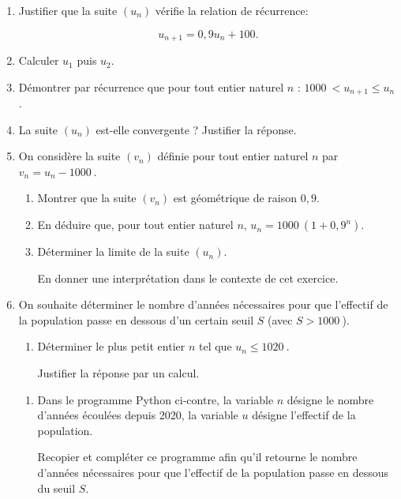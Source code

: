 \documentclass[10pt]{article}
\providecommand{\np}[2][]{{#2~#1}}
\begin{document}
\begin{enumerate}
\item Justifier que la suite $\left(u_n\right)$ vérifie la relation de récurrence:

\[u_{n+1} = 0,9u_n + 100.\]

\item Calculer $u_1$ puis $u_2$.
\item Démontrer par récurrence que pour tout entier naturel $n$ :\: $\np{1000} < u_{n+1}  \leqslant u_n$.
\item La suite $\left(u_n\right)$ est-elle convergente ? Justifier la réponse.
\item On considère la suite $\left(v_n\right)$ définie pour tout entier naturel $n$ par $v_n = u_n - \np{1000}$.
	\begin{enumerate}
		\item Montrer que la suite $\left(v_n\right)$ est géométrique de raison $0,9$.
		\item En déduire que, pour tout entier naturel $n$,\: $u_n = \np{1000} \left(1 + 0,9^n\right)$.
		\item Déterminer la limite de la suite $\left(u_n\right)$.
		
En donner une interprétation dans le contexte de cet exercice.
	\end{enumerate}

\item On souhaite déterminer le nombre d'années nécessaires pour que l'effectif de la population passe en dessous d'un certain seuil $S$ (avec $S > \np{1000}$).
	\begin{enumerate}
		\item Déterminer le plus petit entier $n$ tel que $u_n \leqslant \np{1020}$.

Justifier la réponse par un calcul.
	\end{enumerate}
\begin{minipage}{0.58\linewidth}
	\begin{enumerate}[resume]
		\item Dans le programme Python ci-contre, la variable $n$ désigne le nombre d'années écoulées depuis 2020, la variable $u$ désigne l'effectif de la population. 
		
Recopier et compléter ce programme afin qu'il retourne le nombre d'années nécessaires pour que l'effectif de la population passe en dessous du seuil $S$.
	\end{enumerate}


\end{minipage}
\end{enumerate}
\end{document}

